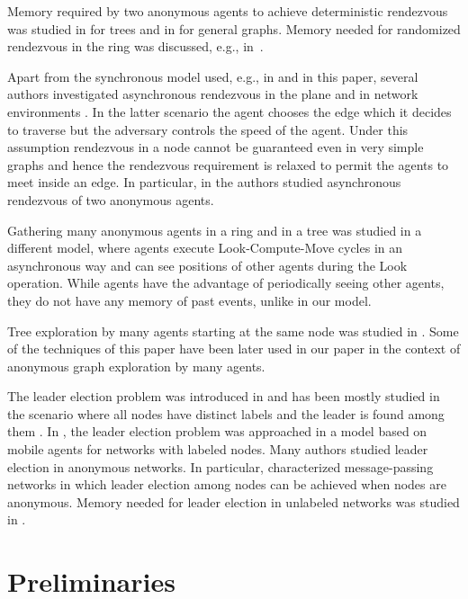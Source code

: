 \documentclass[11pt]{article}
\begin{document}
Memory required by two anonymous agents to achieve deterministic rendezvous was studied in \cite{FP,FP2} for trees and in  \cite{CKP} for general graphs.
Memory needed for randomized rendezvous in the ring was discussed, e.g., in~\cite{KKPM11}. 

Apart from the synchronous model used, e.g., in \cite{CKP,DFKP,TSZ14,YY} and in this paper, several authors investigated asynchronous rendezvous in the plane \cite{CFPS,fpsw} and in network environments
\cite{BCGIL,CLP,DGKKP,DPV,GP}.
In the latter scenario the agent chooses the edge which it decides to traverse but the adversary controls the speed of the agent. Under this assumption rendezvous
in a node cannot be guaranteed even in very simple graphs and hence the rendezvous requirement is relaxed to permit the agents to meet inside an edge.
In particular, in \cite{GP} the authors studied asynchronous rendezvous of two anonymous agents. 

Gathering many anonymous agents in a ring  \cite{DDN,KKN,KMP} and in a tree \cite{FIPS} was studied in a different model, where agents 
execute Look-Compute-Move cycles in an asynchronous way and can see positions of other agents during the Look operation. While agents have the advantage
of periodically seeing other agents, they do not have any memory of past events, unlike in our model.

Tree exploration by many agents starting at the same node was studied in \cite{FGKP}.
Some of the techniques of this paper have been later used in our paper \cite{DP} in the context of anonymous graph exploration by many agents.

The leader election problem was introduced in \cite{LL} and has been mostly studied in the scenario
where all nodes have distinct labels and the leader is found among them \cite{FL,HS,P}. 
In \cite{HKMMJ}, the leader election problem was
approached in a model based on mobile agents for networks with labeled nodes.
Many authors \cite{An,AtSn,BV,YK2,YK3} studied leader election
in anonymous networks. In particular, \cite{YK3} characterized message-passing networks in which
leader election among nodes can be achieved when nodes are anonymous.
Memory needed for leader election in unlabeled networks was studied in \cite{FuPe}. 




\section{Preliminaries}\label{prelim}
\end{document}
